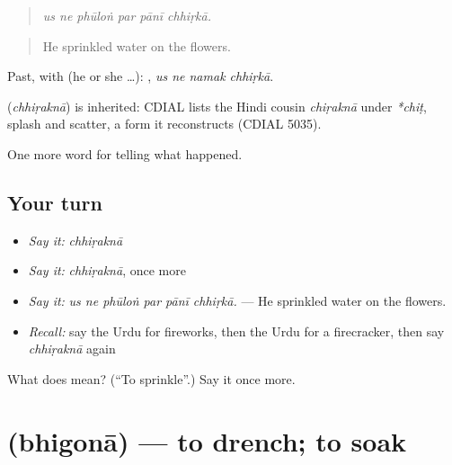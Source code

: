 \begin{quote}
     
\end{quote}

\begin{quote}
\emph{us ne phūloṅ par pānī chhiṛkā.}
\end{quote}

\begin{quote}
He sprinkled water on the flowers.
\end{quote}

Past, with  (he or she …):    , \emph{us ne namak chhiṛkā}.

\begin{cousinweb}
\textbf{} (\emph{chhiṛaknā}) is inherited: CDIAL lists the Hindi cousin \emph{chiṛaknā} under \emph{*chiṭ}, splash and scatter, a form it reconstructs (CDIAL 5035).
\end{cousinweb}

\begin{grammarlens}[title={What you've built}]
One more word for telling what happened.
\end{grammarlens}

\subsection*{Your turn}
\begin{itemize}
\raggedright
  \item \emph{Say it:} \emph{chhiṛaknā}
  \item \emph{Say it:} \emph{chhiṛaknā}, once more
  \item \emph{Say it:} \emph{us ne phūloṅ par pānī chhiṛkā.} — He sprinkled water on the flowers.
  \item \emph{Recall:} say the Urdu for fireworks, then the Urdu for a firecracker, then say \emph{chhiṛaknā} again
\end{itemize}

\begin{tcolorbox}[breakable,colback=teal!4,colframe=teal!35!black,title={Before you move on}]
What does  mean? (\textquotedblleft{}To sprinkle\textquotedblright{}.) Say it once more.
\end{tcolorbox}
\section[\texorpdfstring{\ur{بھگونا} (bhigonā)}{بھگونا (bhigonā)}]{ (bhigonā) — to drench; to soak}

